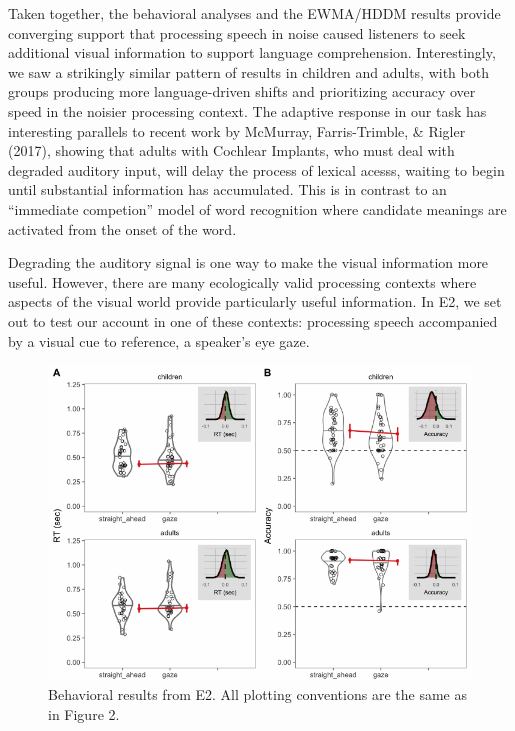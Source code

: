 \documentclass[10pt, letterpaper]{article}
\newenvironment{CodeChunk}{}{}
\begin{document}
Taken together, the behavioral analyses and the EWMA/HDDM results
provide converging support that processing speech in noise caused
listeners to seek additional visual information to support language
comprehension. Interestingly, we saw a strikingly similar pattern of
results in children and adults, with both groups producing more
language-driven shifts and prioritizing accuracy over speed in the
noisier processing context. The adaptive response in our task has
interesting parallels to recent work by McMurray, Farris-Trimble, \&
Rigler (2017), showing that adults with Cochlear Implants, who must deal
with degraded auditory input, will delay the process of lexical acesss,
waiting to begin until substantial information has accumulated. This is
in contrast to an ``immediate competion'' model of word recognition
where candidate meanings are activated from the onset of the word.

Degrading the auditory signal is one way to make the visual information
more useful. However, there are many ecologically valid processing
contexts where aspects of the visual world provide particularly useful
information. In E2, we set out to test our account in one of these
contexts: processing speech accompanied by a visual cue to reference, a
speaker's eye gaze.

\begin{CodeChunk}
\begin{figure}[tb]

{\centering \includegraphics[width=0.8\linewidth]{figs/gaze_acc_rt_e2_plot-1} 

}

\caption[Behavioral results from E2]{Behavioral results from E2. All plotting conventions are the same as in Figure 2.}\label{fig:gaze_acc_rt_e2_plot}
\end{figure}
\end{CodeChunk}
\end{document}
